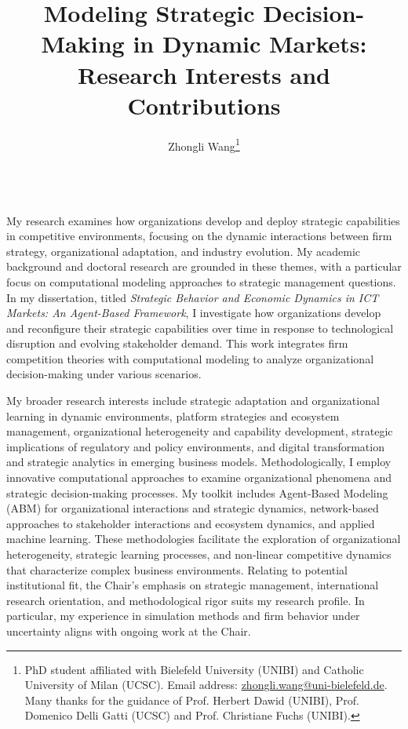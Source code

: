 \documentclass[11pt,a4paper]{article}
\title{Modeling Strategic Decision-Making in Dynamic Markets: Research Interests and Contributions}
\author{%
Zhongli Wang\thanks{PhD student affiliated with Bielefeld University (UNIBI) and Catholic University of Milan (UCSC). Email address: \url{zhongli.wang@uni-bielefeld.de}. Many thanks for the guidance of Prof. Herbert Dawid (UNIBI), Prof. Domenico Delli Gatti (UCSC) and Prof. Christiane Fuchs (UNIBI).} \\\\%
}
\begin{document}
\maketitle


My research examines how organizations develop and deploy strategic capabilities in competitive environments, focusing on the dynamic interactions between firm strategy, organizational adaptation, and industry evolution. 
My academic background and doctoral research are grounded in these themes, with a particular focus on computational modeling approaches to strategic management questions.
In my dissertation, titled \textit{Strategic Behavior and Economic Dynamics in ICT Markets: An Agent-Based Framework}, I investigate how organizations develop and reconfigure their strategic capabilities over time in response to technological disruption and evolving stakeholder demand. 
This work integrates firm competition theories with computational modeling to analyze organizational decision-making under various scenarios.

My broader research interests include strategic adaptation and organizational learning in dynamic environments, platform strategies and ecosystem management, 
organizational heterogeneity and capability development, strategic implications of regulatory and policy environments, and digital transformation and strategic analytics in emerging business models.
Methodologically, I employ innovative computational approaches to examine organizational phenomena and strategic decision-making processes. 
My toolkit includes Agent-Based Modeling (ABM) for organizational interactions and strategic dynamics, network-based approaches to stakeholder interactions and ecosystem dynamics, and applied machine learning.
These methodologies facilitate the exploration of organizational heterogeneity, strategic learning processes, and non-linear competitive dynamics that characterize complex business environments.
Relating to potential institutional fit, the Chair's emphasis on strategic management, international research orientation, and methodological rigor suits my research profile. 
In particular, my experience in simulation methods and firm behavior under uncertainty aligns with ongoing work at the Chair.
\end{document}
